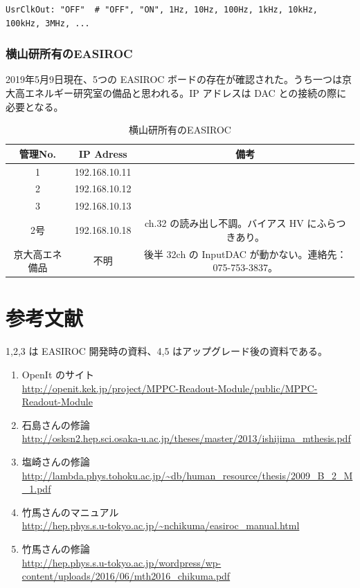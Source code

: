 \documentclass[a4paper]{report}
\begin{document}
\begin{shadebox}
\begin{verbatim}
UsrClkOut: "OFF"  # "OFF", "ON", 1Hz, 10Hz, 100Hz, 1kHz, 10kHz, 100kHz, 3MHz, ...
\end{verbatim}
\end{shadebox}


\newpage
\subsubsection{横山研所有のEASIROC}
2019年5月9日現在、5つの EASIROC ボードの存在が確認された。うち一つは京大高エネルギー研究室の備品と思われる。IP アドレスは DAC との接続の際に必要となる。
\begin{table}[H]
\begin{center}
\caption{横山研所有のEASIROC}
\begin{tabular}{ccc} \hline
管理No. & IP Adress & 備考 \\ \hline
1 & 192.168.10.11 &  \\ 
2 & 192.168.10.12 &  \\ 
3 & 192.168.10.13 &  \\ 
2号 & 192.168.10.18 & ch.32 の読み出し不調。バイアス HV にふらつきあり。 \\ 
京大高エネ備品 & 不明 & 後半 32ch の InputDAC が動かない。連絡先：075-753-3837。  \\ \hline
\end{tabular}
\end{center}
\end{table}


\newpage
\section{参考文献}
1,2,3 は EASIROC 開発時の資料、4,5 はアップグレード後の資料である。
\begin{enumerate}
\item OpenIt のサイト\\
\url{http://openit.kek.jp/project/MPPC-Readout-Module/public/MPPC-Readout-Module}
\item 石島さんの修論\\
\url{http://osksn2.hep.sci.osaka-u.ac.jp/theses/master/2013/ishijima_mthesis.pdf}
\item 塩崎さんの修論\\
\url{http://lambda.phys.tohoku.ac.jp/~db/human_resource/thesis/2009_B_2_M_1.pdf}
\item 竹馬さんのマニュアル\\
\url{http://hep.phys.s.u-tokyo.ac.jp/~nchikuma/easiroc_manual.html} 
\item 竹馬さんの修論\\
\url{http://hep.phys.s.u-tokyo.ac.jp/wordpress/wp-content/uploads/2016/06/mth2016_chikuma.pdf}
\end{enumerate}
\end{document}
